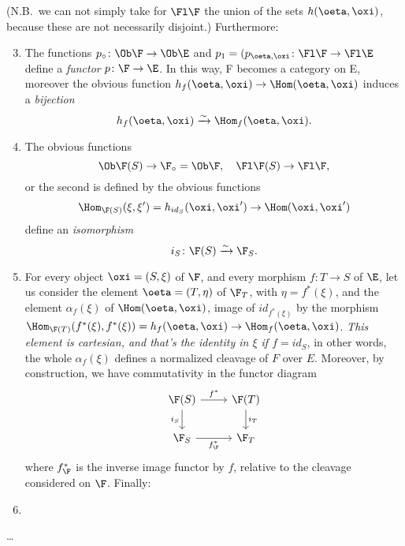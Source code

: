 (N.B.\ we can not simply take for $\Fl \F$ the union of the sets $h (\oeta, \oxi)$, because these are not necessarily disjoint.) Furthermore:
\begin{enumerate}
    \setcounter{enumi}{2}
    \item The functions $p_\circ \colon \Ob \F \to \Ob \E$ and $p_1 = (p_{\oeta, \oxi} \colon \Fl\F \to \Fl \E$ define a \emph{functor} $p \colon \F \to \E$. In this way, F becomes a category on E, moreover the obvious function $h_f (\oeta, \oxi) \to \Hom (\oeta, \oxi)$ induces a \emph{bijection}
    \[h_f(\oeta, \oxi) \xrightarrow{\sim} \Hom_f(\oeta, \oxi).\]
    \item The obvious functions
    \[\Ob \F(S) \to \F_\circ = \Ob \F, \quad \Fl \F(S) \to \Fl\F,\]
    or the second is defined by the obvious functions
    \[\Hom_{\F(S)} (\xi, \xi') = h_{id_S}(\oxi,\oxi') \to \Hom(\oxi, \oxi')\]
    define an \emph{isomorphism}
    \[i_S \colon \F(S) \xrightarrow{\sim} \F_S.\]
    \item For every object $\oxi = (S, \xi)$ of $\F$, and every morphism $f \colon T \to S$ of $\E$, let us consider the element $\oeta = (T, \eta)$ of $\F_T$, with $\eta = f^\ast (\xi)$, and the element $\alpha_f (\xi)$ of $\Hom (\oeta, \oxi)$, image of $id_{f^\ast (\xi)}$ by the morphism $\Hom_{\F (T)} (f^\ast(\xi), f ^\ast(\xi)) = h_f (\oeta, \oxi) \to \Hom_f (\oeta, \oxi)$. \emph{This element is cartesian, and that's the identity in $\xi$ if $f = id_S$}, in other words, the whole $\alpha_f (\xi)$ defines a normalized cleavage of $F$ over $E$. Moreover, by construction, we have commutativity in the functor diagram
    \[
    \begin{tikzcd}
        \F(S)
        \arrow[r, "f^\ast"]
        \arrow[d, "i_S", swap]
        &
        \F(T)
        \arrow[d, "i_T"]
        \\
        \F_S
        \arrow[r, "f^\ast_\F", swap]
        &
        \F_T
    \end{tikzcd}\]
    where $f^\ast_\F$ is the inverse image functor by $f$, relative to the cleavage considered on $\F$. Finally:
    \item 
\end{enumerate}

\dots
